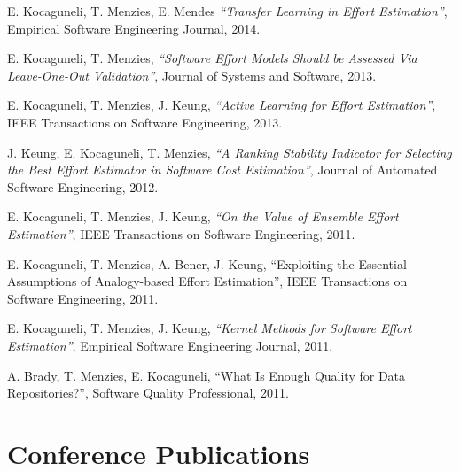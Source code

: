 \documentclass[margin]{res}
\begin{document}
\begin{resume}
\begin{list}{}{\leftmargin=0.5em}
\item E. Kocaguneli, T. Menzies, E. Mendes \textit{``Transfer Learning in Effort Estimation''}, Empirical Software Engineering Journal, 2014.
\item E. Kocaguneli, T. Menzies, \textit{``Software Effort Models Should be Assessed Via
Leave-One-Out Validation''}, Journal of Systems and Software, 2013.
\item E. Kocaguneli, T. Menzies, J. Keung, \textit{``Active Learning for Effort Estimation''}, IEEE Transactions on Software Engineering, 2013.
\item J. Keung, E. Kocaguneli, T. Menzies, \textit{``A Ranking Stability Indicator for Selecting the Best Effort Estimator in Software Cost Estimation''}, Journal of Automated Software Engineering, 2012.
\item E. Kocaguneli, T. Menzies, J. Keung, \textit{``On the Value of Ensemble Effort Estimation''},  IEEE Transactions on Software Engineering, 2011.
\item E. Kocaguneli, T. Menzies, A. Bener, J. Keung, ``Exploiting the Essential Assumptions of Analogy-based Effort Estimation'', IEEE Transactions on Software Engineering, 2011.
\item E. Kocaguneli, T. Menzies, J. Keung, \textit{``Kernel Methods for Software Effort Estimation''}, Empirical Software Engineering Journal, 2011. 
\item A. Brady, T. Menzies, E. Kocaguneli, ``What Is Enough Quality for Data Repositories?'',  Software Quality Professional, 2011.
\end{list}


\section{Conference Publications}


\end{resume}
\end{document}
